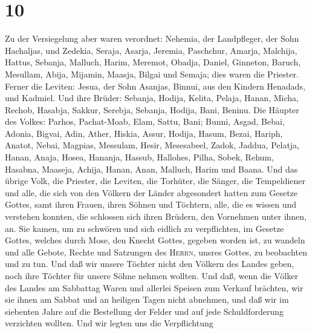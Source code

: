 \hypertarget{section-9}{%
\section{10}\label{section-9}}

 Zu der Versiegelung aber waren verordnet: Nehemia, der
Landpfleger,  der Sohn Hachaljas, und Zedekia, Seraja,
 Asarja, Jeremia, Paschchur, Amarja, 
Malchija, Hattus, Sebanja, Malluch,  Harim, Meremot,
Obadja, Daniel,  Ginneton, Baruch, Mesullam,
 Abija, Mijamin, Maasja, Bilgai und Semaja; 
dies waren die Priester.  Ferner die Leviten: Jesua, der
Sohn Asanjas, Binnui, aus den Kindern Henadads, und Kadmiel.
 Und ihre Brüder: Sebanja, Hodija, Kelita,
 Pelaja, Hanan, Micha,  Rechob, Hasabja,
Sakkur,  Serebja, Sebanja, Hodija, Bani, Beninu.
 Die Häupter des Volkes: Parhos, Pachat-Moab,
 Elam, Sattu, Bani;  Bunni, Asgad, Bebai,
 Adonia, Bigvai, Adin,  Ather, Hiskia,
Assur, Hodija,  Hasum, Bezai, Hariph, 
Anatot, Nebai, Magpias,  Messulam, Hesir, Mesesabeel,
 Zadok, Jaddua, Pelatja,  Hanan, Anaja,
Hosea, Hananja,  Hassub, Hallohes, Pilha, Sobek, Rehum,
 Hasabna, Maaseja,  Achija, Hanan,
 Anan, Malluch, Harim und Baana.  Und das
übrige Volk, die Priester, die Leviten, die Torhüter, die Sänger, die
Tempeldiener und alle, die sich von den Völkern der Länder abgesondert
hatten zum Gesetze Gottes, samt ihren Frauen, ihren Söhnen und Töchtern,
alle, die es wissen und verstehen konnten,  die schlossen
sich ihren Brüdern, den Vornehmen unter ihnen, an. Sie kamen, um zu
schwören und sich eidlich zu verpflichten, im Gesetze Gottes, welches
durch Mose, den Knecht Gottes, gegeben worden ist, zu wandeln und alle
Gebote, Rechte und Satzungen des \textsc{Herrn}, unsres Gottes, zu
beobachten und zu tun.  Und daß wir unsere Töchter nicht
den Völkern des Landes geben, noch ihre Töchter für unsere Söhne nehmen
wollten.  Und daß, wenn die Völker des Landes am
Sabbattag Waren und allerlei Speisen zum Verkauf brächten, wir sie ihnen
am Sabbat und an heiligen Tagen nicht abnehmen, und daß wir im siebenten
Jahre auf die Bestellung der Felder und auf jede Schuldforderung
verzichten wollten.  Und wir legten uns die Verpflichtung
